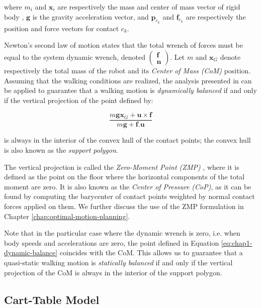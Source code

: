 where $m_i$ and $\mathbf{x}_i$ are respectively the mass and center of
mass vector of rigid body , $\mathbf{g}$ is the gravity
acceleration vector, and $\mathbf{p}_{c_k}$ and $\mathbf{f}_{c_k}$ are
respectively the position and force vectors for contact $c_k$.

Newton's second law of motion states that the total wrench of forces
must be equal to the system dynamic wrench, denoted
$\left(\begin{matrix}\mathbf{f}\\\mathbf{n}\end{matrix}\right)$. Let
$m$ and $\mathbf{x}_G$ denote respectively the total mass of the robot
and its \emph{Center of Mass (CoM)} position. Assuming that the
walking conditions are realized, the analysis presented in
\cite{wieber2002} can be applied to guarantee that a walking motion is
\emph{dynamically balanced} if and only if the vertical projection of
the point defined by:

\begin{equation}
\label{eq:chap1-dynamic-balance}
  \frac{m\mathbf{g}\mathbf{x}_G +
    \mathbf{u}\times\mathbf{f}}{m\mathbf{g} + \mathbf{f}.\mathbf{u}}
\end{equation}

is always in the interior of the convex hull of the contact points;
the convex hull is also known as the \emph{support polygon}.

The vertical projection is called the \emph{Zero-Moment Point (ZMP)}
\cite{vukobratovic1969contribution}, where it is defined as the point
on the floor where the horizontal components of the total moment are
zero. It is also known as the \emph{Center of Pressure (CoP)}, as it
can be found by computing the barycenter of contact points weighted by
normal contact forces applied on them. We further discuss the use of
the ZMP formulation in Chapter \ref{chap:optimal-motion-planning}.

Note that in the particular case where the dynamic wrench is zero,
i.e. when body speeds and accelerations are zero, the point defined in
Equation \ref{eq:chap1-dynamic-balance} coincides with the CoM. This
allows us to guarantee that a quasi-static walking motion is
\emph{statically balanced} if and only if the vertical projection of
the CoM is always in the interior of the support polygon.

\subsection{Cart-Table Model}
\label{subsec:chap1-cart-table}

